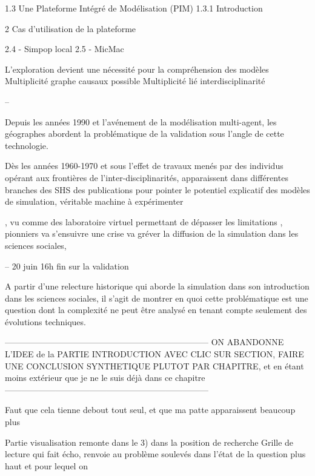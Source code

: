 1.3 Une Plateforme Intégré de Modélisation (PIM)
	1.3.1 Introduction

2 Cas d'utilisation de la plateforme

	2.4 - Simpop local
	2.5 - MicMac 

L'exploration devient une nécessité pour la compréhension des modèles
	Multiplicité graphe causaux possible
	Multiplicité lié interdisciplinarité



--

Depuis les années 1990 et l'avénement de la modélisation multi-agent, les géographes abordent la problématique de la validation sous l'angle de cette technologie.

Dès les années 1960-1970 et sous l'effet de travaux menés par des individus opérant aux frontières de l'inter-disciplinarités, apparaissent dans différentes branches des SHS des publications pour pointer le potentiel explicatif des modèles de simulation, véritable machine à expérimenter 

,  vu comme des laboratoire virtuel permettant de dépasser les limitations  ,  pionniers va s'ensuivre une crise va gréver la diffusion de la simulation dans les sciences sociales, 

--
20 juin 16h fin sur la validation 


A partir d'une relecture historique qui aborde la simulation dans son introduction dans les sciences sociales, il s'agit de montrer en quoi cette problématique est une question dont la complexité ne peut être analysé en tenant compte seulement des évolutions techniques.	

------------------------------------------------------------------------
ON ABANDONNE L'IDEE de la PARTIE INTRODUCTION AVEC CLIC SUR SECTION, FAIRE UNE CONCLUSION SYNTHETIQUE PLUTOT PAR CHAPITRE, et en étant moins extérieur que je ne le suis déjà dans ce chapitre
------------------------------------------------------------------------



Faut que cela tienne debout tout seul, et que ma patte apparaissent beaucoup plus 

Partie visualisation remonte dans le 3) dans la position de recherche
Grille de lecture qui fait écho, renvoie au problème soulevés dans l'état de la question plus haut et pour lequel on 






